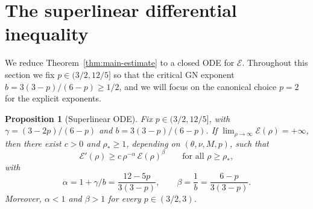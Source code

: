 \documentclass[11pt]{amsart}
\newtheorem{proposition}[theorem]{Proposition}
\theoremstyle{definition}
\newcommand{\EE}{\mathcal{E}}    %
\begin{document}
\section{The superlinear differential inequality}\label{sec:ode}

We reduce Theorem~\ref{thm:main-estimate} to a closed ODE for
$\EE$. Throughout this section we fix $p \in (3/2, 12/5]$ so
that the critical GN exponent $b = 3(3-p)/(6-p) \geq 1/2$, and
we will focus on the canonical choice $p = 2$ for the explicit
exponents.

\begin{proposition}[Superlinear ODE]\label{prop:ODE}
Fix $p \in (3/2, 12/5]$, with $\gamma = (3 - 2p)/(6 - p)$ and
$b = 3(3 - p)/(6 - p)$. If $\lim_{\rho \to \infty} \EE(\rho) =
+\infty$, then there exist $c > 0$ and $\rho_* \geq 1$, depending
on $(\theta, \nu, M, p)$, such that
\begin{equation}\label{eq:superlinear-ODE}
\EE'(\rho) \geq c\,\rho^{-\alpha}\,\EE(\rho)^\beta
\qquad \text{for all } \rho \geq \rho_*,
\end{equation}
with
\[
\alpha = 1 + \gamma/b = \frac{12 - 5p}{3(3 - p)},
\qquad
\beta = \frac{1}{b} = \frac{6 - p}{3(3 - p)}.
\]
Moreover, $\alpha < 1$ and $\beta > 1$ for every
$p \in (3/2, 3)$.
\end{proposition}
\end{document}

